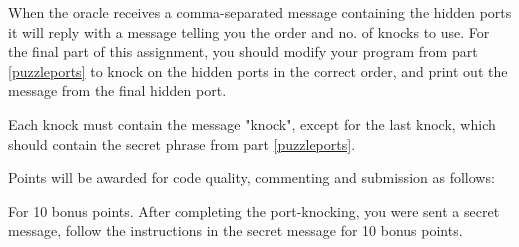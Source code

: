 \documentclass[9pt, addpoints]{exam}
\begin{document}
\begin{questions}
    \question[20]
        \label{portknocking}
        When the oracle receives a comma-separated message containing the hidden ports
       it will reply with a message telling you the order and no. 
       of knocks to use. For the final part of this assignment,
       you should modify your program from part \ref{puzzleports} to knock on the hidden ports in the correct order, and print out the message from the final hidden port.
       
       Each knock must contain the message "knock", except for the last knock, which should contain the secret phrase from part \ref{puzzleports}.
    
    \question
       Points will be awarded for code quality, commenting and submission as follows:
    
     
     \question[10]
     For 10 bonus points. After completing the port-knocking, you were sent a secret message, follow the instructions in the secret message for 10 bonus points.
     
\end{questions}
\end{document}
